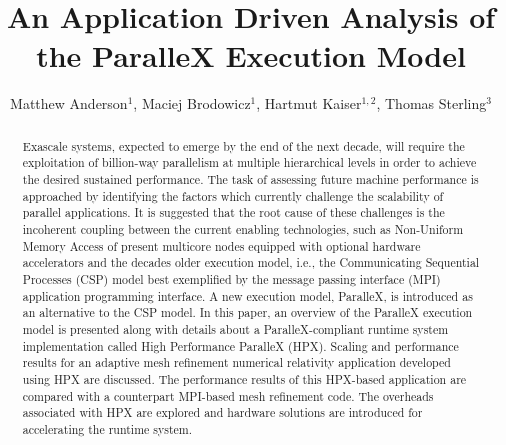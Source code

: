 \documentclass{revtex4}
\begin{document}
\title[An Application Driven Analysis of the ParalleX Execution Model]
{An Application Driven Analysis of the ParalleX Execution Model}


\author{Matthew Anderson$^{1}$,
        Maciej Brodowicz$^{1}$,
        Hartmut Kaiser$^{1,2}$,
        Thomas Sterling$^{3}$}



\begin{abstract}
Exascale systems, expected to emerge by the end of the next decade, 
  will require the exploitation of
  billion-way parallelism at multiple hierarchical levels in order to
  achieve the desired sustained performance.
  The task of assessing future machine performance is approached 
  by identifying the factors which
  currently challenge the scalability of parallel applications.
  It is suggested that the root cause of these challenges is the
  incoherent coupling between the current enabling technologies,
  such as Non-Uniform Memory Access of present multicore 
  nodes equipped with optional hardware accelerators and
  the decades older execution model, i.e., the Communicating Sequential
  Processes (CSP) model best exemplified by the message passing interface (MPI) 
application programming interface. 
  A new execution model, ParalleX, is introduced as an alternative to the CSP model.
  In this paper, an overview 
  of the ParalleX execution model is presented along with details about
  a ParalleX-compliant runtime system implementation called High Performance ParalleX (HPX).  
  Scaling and performance results for an adaptive mesh refinement numerical 
  relativity application developed using HPX are discussed.   The performance results 
  of this HPX-based application are compared with a counterpart MPI-based mesh refinement
  code.  The overheads associated with HPX are explored and
  hardware solutions are introduced for accelerating the runtime system.
\end{abstract}
\end{document}
